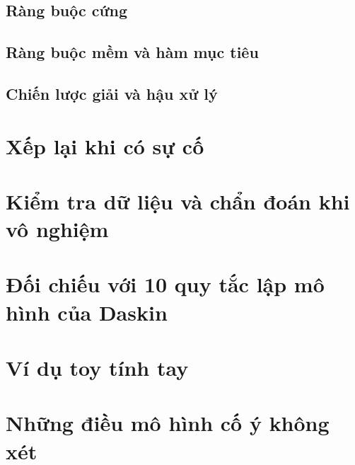 \subsection{Ràng buộc cứng}
\label{subsec:b-cung}

\subsection{Ràng buộc mềm và hàm mục tiêu}
\label{subsec:b-mem}

\subsection{Chiến lược giải và hậu xử lý}
\label{subsec:b-chien-luoc}

\section{Xếp lại khi có sự cố}
\label{sec:xep-lai}

\section{Kiểm tra dữ liệu và chẩn đoán khi vô nghiệm}
\label{sec:chan-doan}

\section{Đối chiếu với 10 quy tắc lập mô hình của Daskin}
\label{sec:daskin}

\section{Ví dụ toy tính tay}
\label{sec:vi-du-toy}

\section{Những điều mô hình cố ý không xét}
\label{sec:khong-xet}
